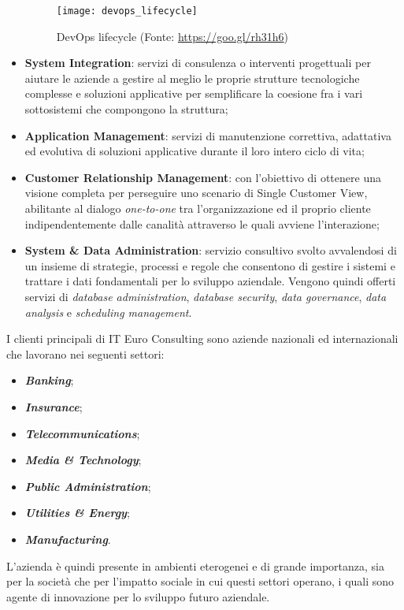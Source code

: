 \begin{itemize}
	\begin{figure}[!h] 
		\centering 
		\texttt{[image: devops\_lifecycle]} 
		\caption{DevOps lifecycle (Fonte: \href{https://goo.gl/rh31h6}{https://goo.gl/rh31h6})}
	\end{figure}
	\newpage
	\item \textbf{System Integration}: servizi di consulenza o interventi progettuali per aiutare le aziende a gestire al meglio le proprie strutture tecnologiche complesse e soluzioni applicative per semplificare la coesione fra i vari sottosistemi che compongono la struttura;
	\item \textbf{Application Management}: servizi di manutenzione correttiva, adattativa ed evolutiva di soluzioni applicative durante il loro intero ciclo di vita;
	\item \textbf{Customer Relationship Management}: con l'obiettivo di ottenere una visione completa per perseguire uno scenario di \gls{Single Customer View}, abilitante al dialogo \textit{one-to-one} tra l'organizzazione ed il proprio cliente indipendentemente dalle canalità attraverso le quali avviene l'interazione;
	\item \textbf{System \& Data Administration}: servizio consultivo svolto avvalendosi di un insieme di strategie, processi e regole che consentono di gestire i sistemi e trattare i dati fondamentali per lo sviluppo aziendale. Vengono quindi offerti servizi di \textit{database administration}, \textit{database security}, \textit{data governance}, \textit{data analysis} e \textit{scheduling management}.
\end{itemize}

I clienti principali di IT Euro Consulting sono aziende nazionali ed internazionali che lavorano nei seguenti settori:
\begin{itemize}
	\item \textit{\textbf{Banking}};
	\item \textit{\textbf{Insurance}};
	\item \textit{\textbf{Telecommunications}};
	\item \textit{\textbf{Media \& Technology}};
	\item \textit{\textbf{Public Administration}};
	\item \textit{\textbf{Utilities \& Energy}};
	\item \textit{\textbf{Manufacturing}}.
\end{itemize}
L'azienda è quindi presente in ambienti eterogenei e di grande importanza, sia per la società che per l'impatto sociale in cui questi settori operano, i quali sono agente di innovazione per lo sviluppo futuro aziendale.

